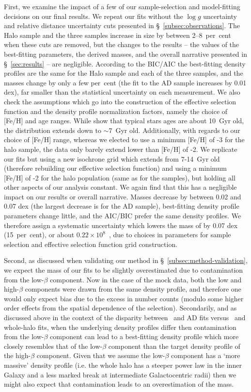 First, we examine the impact of a few of our sample-selection and model-fitting decisions on our final results. We repeat our fits without the $\log g$ uncertainty and relative distance uncertainty cuts presented in \S~\ref{subsec:observations}. The Halo sample and the three \gse samples increase in size by between 2--8~per~cent when these cuts are removed, but the changes to the results -- the values of the best-fitting parameters, the derived masses, and the overall narrative presented in \S~\ref{sec:results} -- are negligible. According to the BIC/AIC the best-fitting density profiles are the same for the Halo sample and each of the three \gse samples, and the masses change by only a few per~cent (the fit to the AD sample increases by 0.01 dex), far smaller than the statistical uncertainty on each measurement. We also check the assumptions which go into the construction of the effective selection function and the density profile normalization factors, namely the choice of [Fe/H] and age ranges. While \textcite{montalban21} show that typical \gse stars ages are about 10~Gyr old, the distribution extends down to $\sim 7$~Gyr old. Additionally, with regards to our choice of [Fe/H] range, whereas we elected to use a minimum [Fe/H] of -3 for the halo sample, the data only barely extend lower than [Fe/H] of -2. We replicate our fits but using a new isochrone grid which extends from 7-14~Gyr old (therefore rebuilding our effective selection function) and using a minimum [Fe/H] of -2 for the halo population (same as for the \gse samples), but holding all other aspects of our analysis constant. We again find that this has a negligible impact on our results or overall narrative. Masses decrease by between 0.02 and 0.07 dex (the largest decrease is for the AD \gse sample), best-fitting density profile parameters change little, and the AIC/BIC prefer the same density profiles. We therefore assign a systematic uncertainty which lowers the mass of \gse by 0.07 dex (15~per~cent), or about $0.22\times10^{8}$~\Msun, due to choices in parameters for sample selection and effective selection function grid construction.

Second, as discussed when validating our method in \S~\ref{subsec:method-validation}, we expect the mass of our fits to be slightly overestimated due to contamination from the low-$\beta$ component. Now in the case of the mock data, both the low and high-$\beta$ components were drawn from the same density profile, and therefore one would only expect bias due to the excess in number counts (modulo some higher order effects from the spatial dependence of the selection). Secondarily, and as discussed above in the context of the disparity between \eLz\ and AD fits versus \JRLz\ and whole-halo fits, when the underlying density profiles differ then contamination from the low-$\beta$ component can lead to a best-fitting density profile which more closely resembles that of the low-$\beta$ component than the target density profile of the high-$\beta$ component. Given that we assume the low-$\beta$ component has a `more massive' density profile (i.e. the whole halo has a steeper power law in the inner Galaxy and a less marked break at intermediate Galactocentric radii) then we might also expect that contamination leads to an overestimation of the mass.

